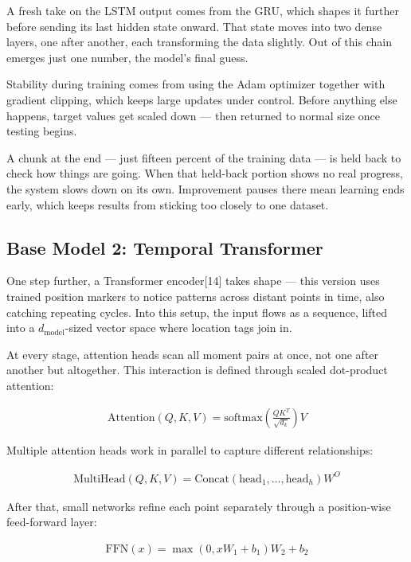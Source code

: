 \documentclass[conference]{IEEEtran}
\begin{document}
A fresh take on the LSTM output comes from the GRU, which shapes it further before sending its last hidden state onward. That state moves into two dense layers, one after another, each transforming the data slightly. Out of this chain emerges just one number, the model's final guess.

Stability during training comes from using the Adam optimizer together with gradient clipping, which keeps large updates under control. Before anything else happens, target values get scaled down — then returned to normal size once testing begins.

A chunk at the end — just fifteen percent of the training data — is held back to check how things are going. When that held-back portion shows no real progress, the system slows down on its own. Improvement pauses there mean learning ends early, which keeps results from sticking too closely to one dataset.

\subsection{Base Model 2: Temporal Transformer}

One step further, a Transformer encoder[14] takes shape — this version uses trained position markers to notice patterns across distant points in time, also catching repeating cycles. Into this setup, the input flows as a sequence, lifted into a $d_{\text{model}}$-sized vector space where location tags join in. 

At every stage, attention heads scan all moment pairs at once, not one after another but altogether. This interaction is defined through scaled dot-product attention:

\begin{align}
\text{Attention}(Q, K, V) = \text{softmax}\left(\frac{QK^T}{\sqrt{d_k}}\right)V
\end{align}

Multiple attention heads work in parallel to capture different relationships:

\begin{align}
\text{MultiHead}(Q, K, V) = \text{Concat}(\text{head}_1, \dots, \text{head}_h)W^O
\end{align}

After that, small networks refine each point separately through a position-wise feed-forward layer:

\begin{align}
\text{FFN}(x) = \max(0, xW_1 + b_1)W_2 + b_2
\end{align}
\end{document}
